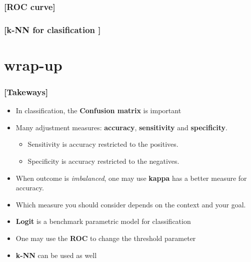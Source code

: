 \documentclass[xcolor=x11names,compress, handhouts]{beamer}
\renewcommand{\(}{\begin{columns}}
\renewcommand{\)}{\end{columns}}
\newcommand{\<}[1]{\begin{column}{#1}}
\renewcommand{\>}{\end{column}}
\begin{document}
\begin{frame} %
\frametitle{\textcolor{brique}{[ROC curve]}}

\end{frame}



\begin{frame} %
\frametitle{\textcolor{brique}{[k-NN for clasification ]}}

\end{frame}

\section{wrap-up}



\begin{frame} %
\frametitle{\textcolor{brique}{[Takeways]}}
\begin{itemize}[<+->]
  \item In classification, the \textbf{Confusion matrix} is important
 \item Many adjustment measures:  \textbf{accuracy}, \textbf{sensitivity} and \textbf{specificity}.
    \begin{itemize}[<+->]
      \item Sensitivity is accuracy restricted to the positives.
      \item Specificity is accuracy restricted to the negatives.
   \end{itemize}
 \item When  outcome is \textit{imbalanced}, one may use \textbf{kappa} has a better measure for accuracy.
  \item[] Which measure you should consider depends on the context and your goal.
 \item \textbf{Logit} is a benchmark parametric model for classification
 \item[] One may use the \textbf{ROC} to change the threshold parameter
 \item \textbf{k-NN} can be used as well
\end{itemize}
\end{frame}



\end{document}
